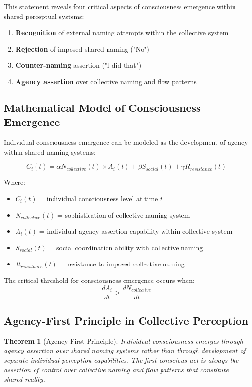 \documentclass[12pt,a4paper]{article}
\newtheorem{theorem}{Theorem}
\begin{document}
This statement reveals four critical aspects of consciousness emergence within shared perceptual systems:
\begin{enumerate}
\item \textbf{Recognition} of external naming attempts within the collective system
\item \textbf{Rejection} of imposed shared naming ("No")
\item \textbf{Counter-naming} assertion ("I did that")
\item \textbf{Agency assertion} over collective naming and flow patterns
\end{enumerate}

\subsection{Mathematical Model of Consciousness Emergence}

Individual consciousness emergence can be modeled as the development of agency within shared naming systems:

\begin{equation}
C_i(t) = \alpha N_{collective}(t) \times A_i(t) + \beta S_{social}(t) + \gamma R_{resistance}(t)
\end{equation}

Where:
\begin{itemize}
\item $C_i(t)$ = individual consciousness level at time $t$
\item $N_{collective}(t)$ = sophistication of collective naming system
\item $A_i(t)$ = individual agency assertion capability within collective system
\item $S_{social}(t)$ = social coordination ability with collective naming
\item $R_{resistance}(t)$ = resistance to imposed collective naming
\end{itemize}

The critical threshold for consciousness emergence occurs when:
$$\frac{dA_i}{dt} > \frac{dN_{collective}}{dt}$$

\subsection{Agency-First Principle in Collective Perception}

\begin{theorem}[Agency-First Principle]
Individual consciousness emerges through agency assertion over shared naming systems rather than through development of separate individual perception capabilities. The first conscious act is always the assertion of control over collective naming and flow patterns that constitute shared reality.
\end{theorem}
\end{document}

